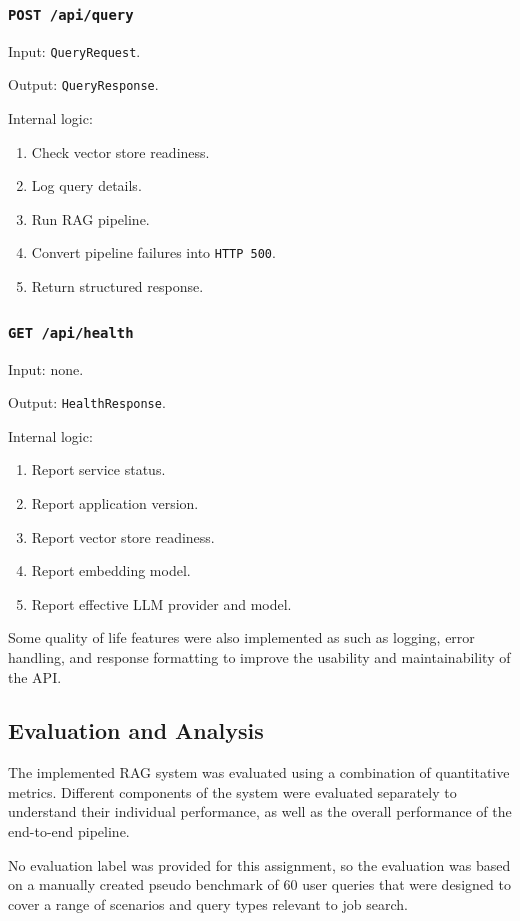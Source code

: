 ﻿\documentclass{article}
\begin{document}
\subsubsection*{\texttt{POST /api/query}}
Input: \texttt{QueryRequest}.

Output: \texttt{QueryResponse}.

Internal logic:
\begin{enumerate}
 \item Check vector store readiness.
 \item Log query details.
 \item Run RAG pipeline.
 \item Convert pipeline failures into \texttt{HTTP 500}.
 \item Return structured response.
\end{enumerate}

\subsubsection*{\texttt{GET /api/health}}
Input: none.

Output: \texttt{HealthResponse}.

Internal logic:
\begin{enumerate}
 \item Report service status.
 \item Report application version.
 \item Report vector store readiness.
 \item Report embedding model.
 \item Report effective LLM provider and model.
\end{enumerate}


Some quality of life features were also implemented as such as logging, error handling, and response formatting to improve the usability and maintainability of the API.


\subsection{Evaluation and Analysis}

The implemented RAG system was evaluated using a combination of quantitative metrics.
Different components of the system were evaluated separately to understand their individual performance, as well as the overall performance of the end-to-end pipeline.

No evaluation label was provided for this assignment, 
so the evaluation was based on a manually created pseudo benchmark of 60 user queries that were designed to cover a range of scenarios and query types relevant to job search.
\end{document}
